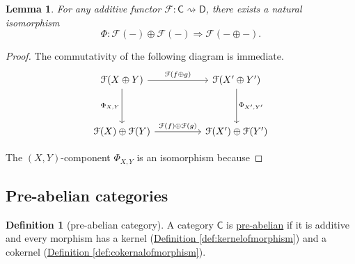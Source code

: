\documentclass[a4paper,10pt]{scrreprt}
\newcommand{\defn}[1]{\ul{#1}}
\theoremstyle{definition}
\newtheorem{definition}{Definition}[section]
\theoremstyle{plain}
\newtheorem{lemma}{Lemma}[section]
\theoremstyle{remark}
\begin{document}
\begin{lemma}
  For any additive functor $\mathcal{F}\colon \mathsf{C} \rightsquigarrow \mathsf{D}$, there exists a natural isomorphism 
  \begin{equation*}
    \Phi\colon \mathcal{F}(-) \oplus \mathcal{F}(-) \Rightarrow \mathcal{F}(- \oplus -).
  \end{equation*}
\end{lemma}
\begin{proof}
  The commutativity of the following diagram is immediate.
  \begin{equation*}
    \begin{tikzcd}[column sep=huge, row sep=huge]
      \mathcal{F}(X \oplus Y)
      \arrow[r, "\mathcal{F}(f \oplus g)"]
      \arrow[d, swap, "\Phi_{X, Y}"]
      & \mathcal{F}(X' \oplus Y')
      \arrow[d, "\Phi_{X', Y'}"]
      \\
      \mathcal{F}(X) \oplus \mathcal{F}(Y)
      \arrow[r, "\mathcal{F}(f) \oplus \mathcal{F}(g)"]
      & \mathcal{F}(X') \oplus \mathcal{F}(Y')
    \end{tikzcd}
  \end{equation*}

  The $(X, Y)$-component $\Phi_{X, Y}$ is an isomorphism because
\end{proof}

\subsection{Pre-abelian categories} \label{sec:preabeliancategories}
\begin{definition}[pre-abelian category]
  \label{def:preabeliancategory}
  A category  $\mathsf{C}$ is \defn{pre-abelian} if it is additive and every morphism has a kernel (\hyperref[def:kernelofmorphism]{Definition \ref*{def:kernelofmorphism}}) and a cokernel (\hyperref[def:cokernalofmorphism]{Definition \ref*{def:cokernalofmorphism}}).
\end{definition}
\end{document}
